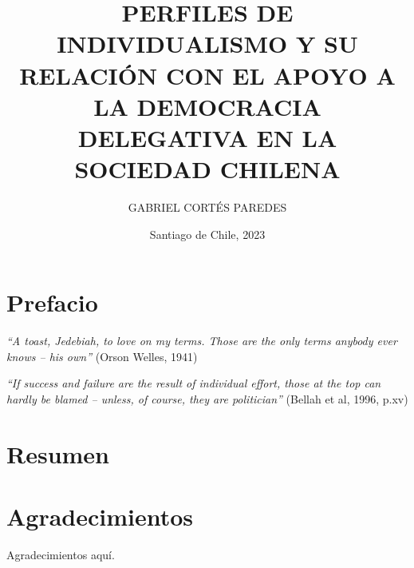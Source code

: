 \documentclass[12pt,twoside]{templates/facsothesis}
\title{PERFILES DE INDIVIDUALISMO Y SU RELACIÓN CON EL APOYO A LA DEMOCRACIA DELEGATIVA EN LA SOCIEDAD CHILENA}
\author{GABRIEL CORTÉS PAREDES}
\date{Santiago de Chile, 2023}
\begin{document}

  \maketitle

\frontmatter %
\pagestyle{empty} %



  \setcounter{tocdepth}{1}
  \setlength{\parskip}{0pt}
  \tableofcontents

\setlength\parskip{1em plus 0.1em minus 0.2em}

  \listoftables

  \listoffigures



\mainmatter %
\titleformat{\chapter}{\normalfont\Huge\bfseries}{\thechapter}{1em}{}
\pagestyle{fancyplain} %

\hypertarget{prefacio}{%
\chapter*{Prefacio}\label{prefacio}}

\emph{``A toast, Jedebiah, to love on my terms. Those are the only terms anybody ever knows -- his own''} (Orson Welles, 1941)

\emph{``If success and failure are the result of individual effort, those at the top can hardly be blamed -- unless, of course, they are politician''} (Bellah et al, 1996, p.xv)

\hypertarget{resumen}{%
\chapter*{Resumen}\label{resumen}}

\hypertarget{agradecimientos}{%
\chapter*{Agradecimientos}\label{agradecimientos}}

Agradecimientos aquí.
\end{document}
